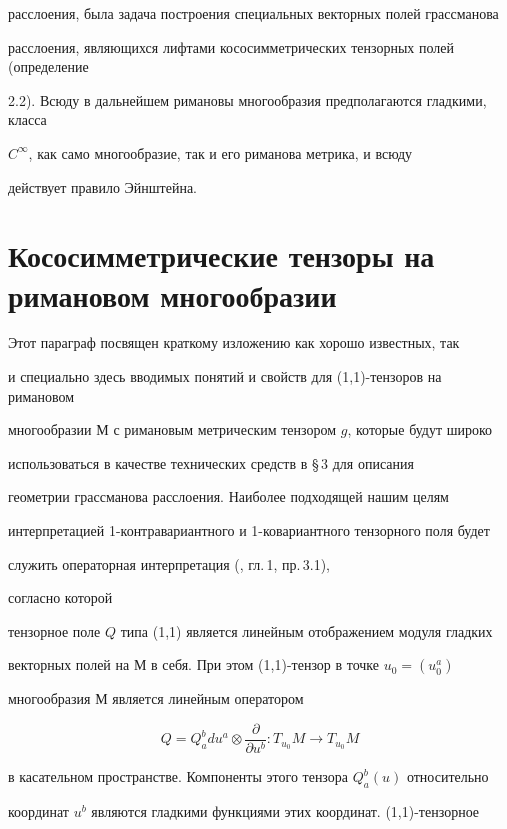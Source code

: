 расслоения, была задача построения специальных векторных полей грассманова


расслоения, являющихся лифтами кососимметрических тензорных полей (определение


2.2). Всюду в дальнейшем римановы многообразия предполагаются гладкими, класса


$C^{\infty}$, как само многообразие, так и его риманова метрика, и всюду


действует правило Эйнштейна.





\section{Кососимметрические тензоры на римановом многообразии}





Этот параграф посвящен краткому изложению как хорошо известных, так


и специально здесь вводимых понятий и свойств для (1,1)-тензоров на римановом


многообразии $М$ с римановым метрическим тензором $g$, которые будут широко


использоваться в качестве технических средств в \S\,3 для описания


геометрии грассманова расслоения. Наиболее подходящей нашим целям


интерпретацией 1-контравариантного и 1-ковариантного тензорного поля будет


служить операторная интерпретация (\cite{Kob1}, гл.\,1, пр.\,3.1),


согласно которой


тензорное поле $Q$ типа (1,1) является линейным отображением модуля гладких


векторных полей на $М$ в себя. При этом (1,1)-тензор в точке $u_0=(u_0^a)$


многообразия $М$ является линейным оператором


\begin{equation}


Q=Q^b_adu^a\otimes \frac{\partial}{\partial u^b}:T_{u_0}M\to T_{u_0}M


\end{equation}


в касательном пространстве. Компоненты этого тензора $Q^b_a(u)$ относительно


координат $u^b$ являются гладкими функциями этих координат. (1,1)-тензорное


